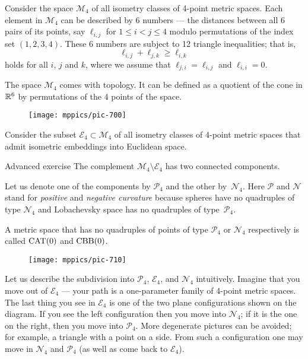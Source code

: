 Consider the space $\mathcal{M}_4$ of all isometry classes of 4-point metric spaces.
Each element in $\mathcal{M}_4$ can be described by 6 numbers 
 --- the distances between all 6 pairs of its points, say $\ell_{i,j}$ for $1\le i< j\le 4$ modulo permutations of the index set $(1,2,3,4)$.
These 6 numbers are subject to 12 triangle inequalities; that is,
\[\ell_{i,j}+\ell_{j,k}\ge \ell_{i,k}\]
holds for all $i$, $j$ and $k$, where we assume that $\ell_{j,i}=\ell_{i,j}$ and $\ell_{i,i}=0$.

The space $\mathcal{M}_4$ comes with topology.
It can be defined as a quotient of the cone in $\mathbb{R}^6$ by permutations of the 4 points of the space.

\begin{wrapfigure}[7]{i}{33mm}
\vskip-0mm
\centering
\texttt{[image: mppics/pic-700]}
\end{wrapfigure}

Consider the subset $\mathcal{E}_4\subset \mathcal{M}_4$ of all isometry classes of 4-point metric spaces that admit isometric embeddings into Euclidean space.

\begin{thm}{Advanced exercise}\label{clm:two-components-of-M4}
The complement $\mathcal{M}_4\setminus \mathcal{E}_4$ has two connected components.
\end{thm}

Let us denote one of the components by $\mathcal{P}_4$ and the other by~$\mathcal{N}_4$.
Here $\mathcal{P}$ and $\mathcal{N}$ stand for {}\emph{positive} 
and {}\emph{negative curvature} because spheres have no quadruples of type $\mathcal{N}_4$ and 
Lobachevsky space
has no quadruples of type~$\mathcal{P}_4$.

A metric space 
that has no quadruples of points of type $\mathcal{P}_4$ or $\mathcal{N}_4$
respectively 
is called $\mathrm{CAT}(0)$ and $\mathrm{CBB}(0)$.

\begin{wrapfigure}{o}{33mm}
\vskip-2mm
\centering
\texttt{[image: mppics/pic-710]}
\end{wrapfigure}

Let us describe the subdivision into $\mathcal{P}_4$, $\mathcal{E}_4$, and $\mathcal{N}_4$ intuitively.
Imagine that you move out of $\mathcal{E}_4$ --- your path is a one-parameter family of 4-point metric spaces.
The last thing you see in $\mathcal{E}_4$ is one of the two plane configurations shown on the diagram.
If you see the left configuration then you move into $\mathcal{N}_4$;
if it is the one on the right, then you move into $\mathcal{P}_4$.
More degenerate pictures can be avoided; for example, a triangle with a point on a side.
From such a configuration one may move in $\mathcal{N}_4$ and $\mathcal{P}_4$ (as well as come back to $\mathcal{E}_4$).

